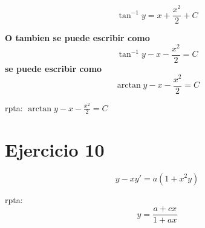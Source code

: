 \documentclass[12pt,a4paper]{article}
\begin{document}
\begin{multicols}{2}
\[\tan^{-1}y=x+\frac{x^2}{2}+C\]

\textbf{O tambien se puede escribir como}
\[\tan^{-1}y - x - \frac{x^2}{2}=C\]
\textbf{se puede escribir como}
\[\arctan y - x - \frac{x^2}{2}=C\]


rpta: $\arctan y-x-\frac{x^2}{2}=C$

\section*{Ejercicio 10}

\[y- xy\prime=a(1+x^2y)\]

rpta: \[y=\frac{a+cx}{1+ax}\]

\end{multicols}
\end{document}
